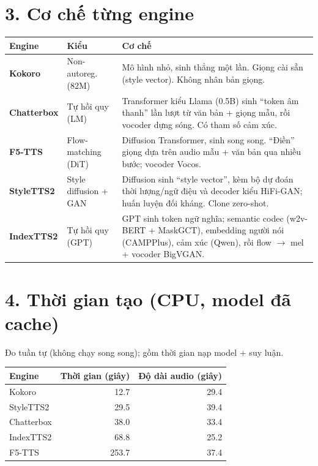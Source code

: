 \documentclass[11pt]{article}
\begin{document}
\section*{3. Cơ chế từng engine}
\begin{table}[H]\centering\small
\begin{tabular}{>{\bfseries}l l p{9.2cm}}
\toprule
Engine & Kiểu & Cơ chế \\
\midrule
Kokoro & Non-autoreg. (82M) & Mô hình nhỏ, sinh thẳng một lần. Giọng cài sẵn (style vector). Không nhân bản giọng. \\
Chatterbox & Tự hồi quy (LM) & Transformer kiểu Llama (0.5B) sinh ``token âm thanh'' lần lượt từ văn bản + giọng mẫu, rồi vocoder dựng sóng. Có tham số cảm xúc. \\
F5-TTS & Flow-matching (DiT) & Diffusion Transformer, sinh song song. ``Điền'' giọng dựa trên audio mẫu + văn bản qua nhiều bước; vocoder Vocos. \\
StyleTTS2 & Style diffusion + GAN & Diffusion sinh ``style vector'', kèm bộ dự đoán thời lượng/ngữ điệu và decoder kiểu HiFi-GAN; huấn luyện đối kháng. Clone zero-shot. \\
IndexTTS2 & Tự hồi quy (GPT) & GPT sinh token ngữ nghĩa; semantic codec (w2v-BERT + MaskGCT), embedding người nói (CAMPPlus), cảm xúc (Qwen), rồi flow $\rightarrow$ mel + vocoder BigVGAN. \\
\bottomrule
\end{tabular}
\end{table}

\section*{4. Thời gian tạo (CPU, model đã cache)}
Đo tuần tự (không chạy song song); gồm thời gian nạp model + suy luận.
\begin{table}[H]\centering
\begin{tabular}{l r r}
\toprule
Engine & Thời gian (giây) & Độ dài audio (giây) \\
\midrule
Kokoro & 12.7 & 29.4 \\
StyleTTS2 & 29.5 & 39.4 \\
Chatterbox & 38.0 & 33.4 \\
IndexTTS2 & 68.8 & 25.2 \\
F5-TTS & 253.7 & 37.4 \\
\bottomrule
\end{tabular}
\end{table}
\end{document}
